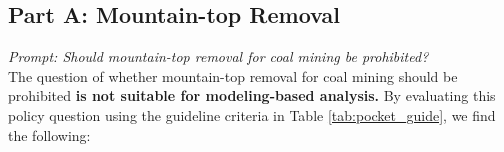 \documentclass[journal, onecolumn, 12pt]{IEEEtran}
\begin{document}
\newpage

\subsection{Part A: Mountain-top Removal}
\textit{Prompt: Should mountain-top removal for coal mining be prohibited?}\\

The question of whether mountain-top removal for coal mining should be prohibited  \textbf{is not suitable for modeling-based analysis.} By evaluating this policy question  using the guideline criteria in Table \ref{tab:pocket_guide}, we find the following:


\end{document}
